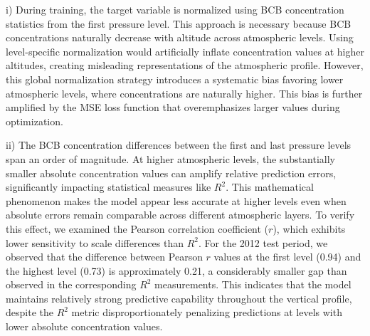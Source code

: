 \documentclass{article}
\begin{document}
    

    i) During training, the target variable is normalized using BCB concentration statistics from the first pressure level. This approach is necessary because BCB concentrations naturally decrease with altitude across atmospheric levels. Using level-specific normalization would artificially inflate concentration values at higher altitudes, creating misleading representations of the atmospheric profile. However, this global normalization strategy introduces a systematic bias favoring lower atmospheric levels, where concentrations are naturally higher. This bias is further amplified by the MSE loss function that overemphasizes larger values during optimization.

    ii) The BCB concentration differences between the first and last pressure levels span an order of magnitude. At higher atmospheric levels, the substantially smaller absolute concentration values can amplify relative prediction errors, significantly impacting statistical measures like $R^2$. This mathematical phenomenon makes the model appear less accurate at higher levels even when absolute errors remain comparable across different atmospheric layers. To verify this effect, we examined the Pearson correlation coefficient ($r$), which exhibits lower sensitivity to scale differences than $R^2$. For the 2012 test period, we observed that the difference between Pearson $r$ values at the first level (0.94) and the highest level (0.73) is approximately 0.21, a considerably smaller gap than observed in the corresponding $R^2$ measurements. This indicates that the model maintains relatively strong predictive capability throughout the vertical profile, despite the $R^2$ metric disproportionately penalizing predictions at levels with lower absolute concentration values. 
    
\end{document}
